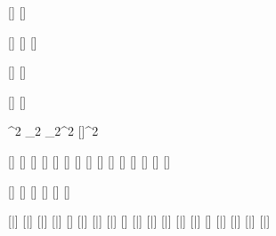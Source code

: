 

\varDef{\angleTwo}{\beta}
\varDef{\angleOne}{\alpha}
\varDef{\angleFour}{\Pi}
\varDef{\angleThree}{\Gamma}

[\mathbb]
[\mathbb]

[\mathcal]
[\mathcal]
[\mathbb]

[\mathcal]
[\mathcal]

[\vectorFmt]
[\unitVecFmt]

^{2}
_{2}
_{2}^{2}
[\vectorFmt]^{2}

\varDef{\rbardot}{\rbar}[\dot]
\varDef{\rbarddot}{\rbar}[\ddot]
[\dot]
\varDef{\rhobardot}{\rhobar}[\dot]
\varDef{\rhodot}{\rho}[\dot]
\varDef{\thetadot}{\theta}[\dot]
[\ddot]
[\ddot]
[\dot]
[\ddot]
[\ddot]
[\dot]
[\ddot]
[\ddot]
[\dot]

[\hat]
[\hat]
[\hat]
[\hat]
[\hat]
[\hat]

[\bar]
[\bar]
[\bar]
[\bar]
[\tilde]
[\bar]
[\bar]
[\bar]
\varDef{\qbardot}{\qbar}[\dot]
[\bar]
[\bar]
[\bar]
[\bar]
[\bar]
\varDef{\xbardot}{\xbar}[\dot]
[\bar]
\varDef{\nubar}{\nu}[\bar]
\varDef{\rhobar}{\rho}[\bar]
\varDef{\omegabar}{\omega}[\bar]
